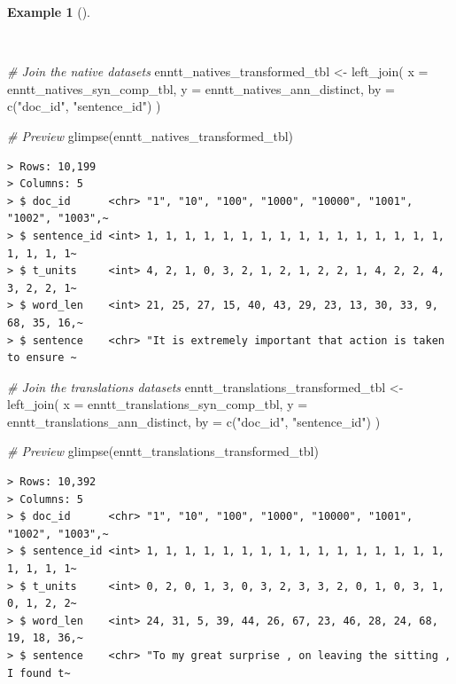 \documentclass[
  letterpaper,
  DIV=11,
  numbers=noendperiod]{scrreprt}
\newenvironment{Shaded}{\begin{snugshade}}{\end{snugshade}}
\newcommand{\AttributeTok}[1]{\textcolor[rgb]{0.00,0.00,0.00}{#1}}
\newcommand{\CommentTok}[1]{\textcolor[rgb]{0.00,0.00,0.00}{\textit{#1}}}
\newcommand{\FunctionTok}[1]{\textcolor[rgb]{0.00,0.00,0.00}{#1}}
\newcommand{\NormalTok}[1]{\textcolor[rgb]{0.00,0.00,0.00}{#1}}
\newcommand{\OtherTok}[1]{\textcolor[rgb]{0.00,0.00,0.00}{#1}}
\newcommand{\StringTok}[1]{\textcolor[rgb]{0.00,0.00,0.00}{#1}}
\theoremstyle{definition}
\newtheorem{example}{Example}[chapter]
\theoremstyle{remark}
\begin{document}
\begin{example}[]\protect\hypertarget{exm-td-merging-join-left-syn-comp}{}\label{exm-td-merging-join-left-syn-comp}

~

\begin{Shaded}
\begin{Highlighting}[]
\CommentTok{\# Join the native datasets}
\NormalTok{enntt\_natives\_transformed\_tbl }\OtherTok{\textless{}{-}}
  \FunctionTok{left\_join}\NormalTok{(}
    \AttributeTok{x =}\NormalTok{ enntt\_natives\_syn\_comp\_tbl,}
    \AttributeTok{y =}\NormalTok{ enntt\_natives\_ann\_distinct,}
    \AttributeTok{by =} \FunctionTok{c}\NormalTok{(}\StringTok{"doc\_id"}\NormalTok{, }\StringTok{"sentence\_id"}\NormalTok{)}
\NormalTok{  )}

\CommentTok{\# Preview}
\FunctionTok{glimpse}\NormalTok{(enntt\_natives\_transformed\_tbl)}
\end{Highlighting}
\end{Shaded}

\begin{verbatim}
> Rows: 10,199
> Columns: 5
> $ doc_id      <chr> "1", "10", "100", "1000", "10000", "1001", "1002", "1003",~
> $ sentence_id <int> 1, 1, 1, 1, 1, 1, 1, 1, 1, 1, 1, 1, 1, 1, 1, 1, 1, 1, 1, 1~
> $ t_units     <int> 4, 2, 1, 0, 3, 2, 1, 2, 1, 2, 2, 1, 4, 2, 2, 4, 3, 2, 2, 1~
> $ word_len    <int> 21, 25, 27, 15, 40, 43, 29, 23, 13, 30, 33, 9, 68, 35, 16,~
> $ sentence    <chr> "It is extremely important that action is taken to ensure ~
\end{verbatim}

\begin{Shaded}
\begin{Highlighting}[]
\CommentTok{\# Join the translations datasets}
\NormalTok{enntt\_translations\_transformed\_tbl }\OtherTok{\textless{}{-}}
  \FunctionTok{left\_join}\NormalTok{(}
    \AttributeTok{x =}\NormalTok{ enntt\_translations\_syn\_comp\_tbl,}
    \AttributeTok{y =}\NormalTok{ enntt\_translations\_ann\_distinct,}
    \AttributeTok{by =} \FunctionTok{c}\NormalTok{(}\StringTok{"doc\_id"}\NormalTok{, }\StringTok{"sentence\_id"}\NormalTok{)}
\NormalTok{  )}

\CommentTok{\# Preview}
\FunctionTok{glimpse}\NormalTok{(enntt\_translations\_transformed\_tbl)}
\end{Highlighting}
\end{Shaded}

\begin{verbatim}
> Rows: 10,392
> Columns: 5
> $ doc_id      <chr> "1", "10", "100", "1000", "10000", "1001", "1002", "1003",~
> $ sentence_id <int> 1, 1, 1, 1, 1, 1, 1, 1, 1, 1, 1, 1, 1, 1, 1, 1, 1, 1, 1, 1~
> $ t_units     <int> 0, 2, 0, 1, 3, 0, 3, 2, 3, 3, 2, 0, 1, 0, 3, 1, 0, 1, 2, 2~
> $ word_len    <int> 24, 31, 5, 39, 44, 26, 67, 23, 46, 28, 24, 68, 19, 18, 36,~
> $ sentence    <chr> "To my great surprise , on leaving the sitting , I found t~
\end{verbatim}

\end{example}
\end{document}
